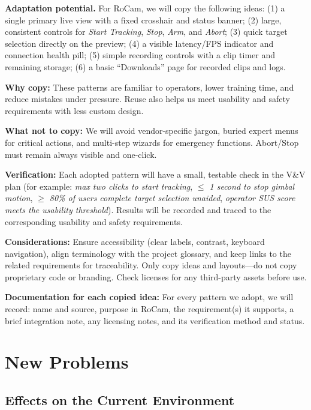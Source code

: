 \documentclass[12pt]{article}
\begin{document}
\textbf{Adaptation potential.}
For RoCam, we will copy the following ideas:
(1) a single primary live view with a fixed crosshair and status banner;
(2) large, consistent controls for \emph{Start Tracking}, \emph{Stop}, \emph{Arm}, and \emph{Abort};
(3) quick target selection directly on the preview;
(4) a visible latency/FPS indicator and connection health pill;
(5) simple recording controls with a clip timer and remaining storage;
(6) a basic “Downloads” page for recorded clips and logs.

\textbf{Why copy:}
These patterns are familiar to operators, lower training time, and reduce mistakes under pressure. Reuse also helps us meet usability and safety requirements with less custom design.

\textbf{What not to copy:}
We will avoid vendor-specific jargon, buried expert menus for critical actions, and multi-step wizards for emergency functions. Abort/Stop must remain always visible and one-click.

\textbf{Verification:}
Each adopted pattern will have a small, testable check in the V\&V plan (for example: \emph{max two clicks to start tracking}, \emph{$\leq$ 1 second to stop gimbal motion}, \emph{$\geq$ 80\% of users complete target selection unaided}, \emph{operator SUS score meets the usability threshold}). Results will be recorded and traced to the corresponding usability and safety requirements.

\textbf{Considerations:}
Ensure accessibility (clear labels, contrast, keyboard navigation), align terminology with the project glossary, and keep links to the related requirements for traceability. Only copy ideas and layouts—do not copy proprietary code or branding. Check licenses for any third-party assets before use.

\textbf{Documentation for each copied idea:}
For every pattern we adopt, we will record: name and source, purpose in RoCam, the requirement(s) it supports, a brief integration note, any licensing notes, and its verification method and status.


\section{New Problems}
\subsection{Effects on the Current Environment}
\end{document}
